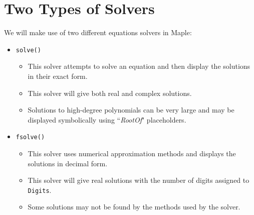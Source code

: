 
\begin{maplegroup}
\begin{mapleinput}
\end{mapleinput}
\mapleresult
\begin{maplelatex}
\end{maplelatex}
\mapleresult
\begin{maplelatex}
\end{maplelatex}
\end{maplegroup}

\section{Two Types of Solvers}

We will make use of two different equations solvers in Maple:
\begin{itemize}
\item \texttt{solve()}
	\begin{itemize}
	\item This solver attempts to solve an equation and then display the solutions in their exact form.
	\item This solver will give both real and complex solutions.
	\item Solutions to high-degree polynomials can be very large and may be displayed symbolically using ``\textit{RootOf}" placeholders.
	\end{itemize}
\item \texttt{fsolve()}
	\begin{itemize}
	\item This solver uses numerical approximation methods and displays the solutions in decimal form. 
	\item This solver will give real solutions with the number of digits assigned to \texttt{Digits}.
	\item Some solutions may not be found by the methods used by the solver.
	\end{itemize}
\end{itemize}

